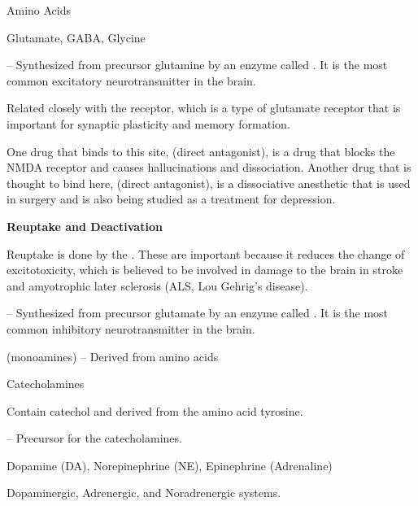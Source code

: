 \begin{coloredlist}
    \item Amino Acids
    \begin{coloredlist}
        \item Glutamate, GABA, Glycine
        \begin{coloredlist}
            \item {} -- Synthesized from precursor glutamine by an enzyme called . It is the most common excitatory neurotransmitter in the brain.
            \begin{coloredlist}
                \item Related closely with the  receptor, which is a type of glutamate receptor that is important for synaptic plasticity and memory formation.
                \item One drug that binds to this site,  (direct antagonist), is a drug that blocks the NMDA receptor and causes hallucinations and dissociation. Another drug that is thought to bind here,  (direct antagonist), is a dissociative anesthetic that is used in surgery and is also being studied as a treatment for depression.
                \item \textbf{Reuptake and Deactivation}
                \begin{coloredlist}
                    \item Reuptake is done by the . These are important because it reduces the change of excitotoxicity, which is believed to be involved in damage to the brain in stroke and amyotrophic later sclerosis (ALS, Lou Gehrig's disease).
                \end{coloredlist}
            \end{coloredlist}
            \item {} -- Synthesized from precursor glutamate by an enzyme called . It is the most common inhibitory neurotransmitter in the brain.
        \end{coloredlist}
    \end{coloredlist}
    \item {} (monoamines) -- Derived from amino acids
    \begin{coloredlist}
        \item Catecholamines
        \begin{coloredlist}
            \item Contain catechol and derived from the amino acid tyrosine.
            \item {} -- Precursor for the catecholamines.
            \item Dopamine (DA), Norepinephrine (NE), Epinephrine (Adrenaline)
            \item Dopaminergic, Adrenergic, and Noradrenergic systems.
        \end{coloredlist}


\end{coloredlist}
\end{coloredlist}
